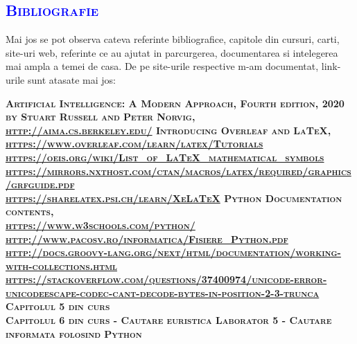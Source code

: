 \documentclass{article}
\begin{document}
\newpage
\begin{flushleft}
\begin{center}
      \textcolor{blue}{\section{\bfseries\scshape\textcolor{blue}{Bibliografie}}}
      \vspace{2mm}
\end{center}
\end{flushleft}
\begin{flushleft}
    \quad Mai jos se pot observa cateva referinte bibliografice, capitole din cursuri, carti, site-uri web, referinte ce au ajutat in parcurgerea, documentarea si intelegerea mai ampla a temei de casa. De pe site-urile respective m-am documentat, link-urile sunt atasate mai jos: \par
\begin{thebibliography}{8}
\bfseries\scshape
         Artificial Intelligence: A Modern Approach, Fourth edition, 2020 by Stuart Russell and Peter Norvig,
        \textcolor{blue}{\\\url{http://aima.cs.berkeley.edu/}}
        Introducing Overleaf and LaTeX,
        \textcolor{blue}{\\\url{https://www.overleaf.com/learn/latex/Tutorials}
        \\\url{https://oeis.org/wiki/List_of_LaTeX_mathematical_symbols}
        \\\url{https://mirrors.nxthost.com/ctan/macros/latex/required/graphics/grfguide.pdf}
        \\\url{https://sharelatex.psi.ch/learn/XeLaTeX}}
        Python Documentation contents,
        \textcolor{blue}{\\\url{https://www.w3schools.com/python/}
        \\\url{http://www.pacosv.ro/informatica/Fisiere_Python.pdf}
        \\\url{http://docs.groovy-lang.org/next/html/documentation/working-with-collections.html}
        \\\url{https://stackoverflow.com/questions/37400974/unicode-error-unicodeescape-codec-cant-decode-bytes-in-position-2-3-trunca}}
         Capitolul 5 din curs\\
         Capitolul 6 din curs - Cautare euristica
         Laborator 5 - Cautare informata folosind Python

\end{thebibliography}
\end{flushleft}
\end{document}
